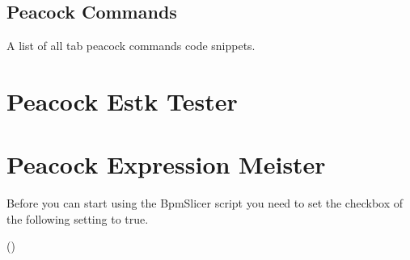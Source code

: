 \documentclass[a4paper,11pt,openany,oneside,english]{sphinxmanual}
\begin{document}
\subsection{Peacock Commands}
\label{\detokenize{modules/console/readme:peacock-commands}}
A list of all tab peacock commands code snippets.
\begin{description}
\item[{}] \leavevmode
\begin{sphinxVerbatim}[commandchars=\\\{\}]
     
\end{sphinxVerbatim}

\item[{}] \leavevmode
\begin{sphinxVerbatim}[commandchars=\\\{\}]
     
\end{sphinxVerbatim}

\end{description}


\section{Peacock Estk Tester}
\label{\detokenize{modules/estk_tester/readme:peacock-estk-tester}}\label{\detokenize{modules/estk_tester/readme::doc}}

\section{Peacock Expression Meister}
\label{\detokenize{modules/expressionmeister/readme:peacock-expression-meister}}\label{\detokenize{modules/expressionmeister/readme::doc}}
Before you can start using the BpmSlicer script you need to set the checkbox of the following setting to true.

()
\end{document}
